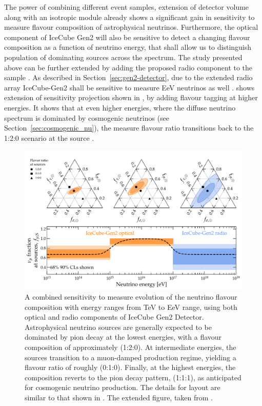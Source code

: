 The power of combining different event samples, extension of detector volume along with an isotropic module already shows a significant gain in sensitivity to measure flavour composition of astrophysical neutrinos. Furthermore, the optical component of IceCube Gen2 will also be sensitive to detect a changing flavour composition as a function of neutrino energy, that shall allow us to distinguish population of dominating sources across the spectrum. The study presented above can be further extended by adding the proposed radio component to the sample . As described in Section~\ref{sec:gen2-detector}, due to the extended radio array IceCube-Gen2 shall be sensitive to measure EeV neutrinos as well .  shows extension of sensitivity projection shown in , by adding flavour tagging at higher energies. It shows that at even higher energies, where the diffuse neutrino spectrum is dominated by cosmogenic neutrinos (see Section~\ref{sec:cosmogenic_nu}), the measure flavour ratio transitions back to the 1:2:0 scenario at the source \cite{Coleman}.  


\begin{figure}[h!]
    \centering
        \includegraphics{./figures/gen2/energy_dependence_Gen2_TA-GZK.pdf}
        \caption[A combined sensitivity of IceCube-Gen2 to measure flavour composition of Astrophysical neutrino using both optical and radio components of the detector]{A combined sensitivity to measure evolution of the neutrino flavour composition with energy ranges from TeV to EeV range, using both optical and radio components of IceCube Gen2 Detector. Astrophysical neutrino sources are generally expected to be dominated by pion decay at the lowest energies, with a flavour composition of approximately (1:2:0). At intermediate energies, the sources transition to a muon-damped production regime, yielding a flavour ratio of roughly (0:1:0). Finally, at the highest energies, the composition reverts to the pion decay pattern, (1:1:1), as anticipated for cosmogenic neutrino production. The details for layout are similar to that shown in . The extended figure, taken from \cite{Coleman}.}
    \end{figure}

